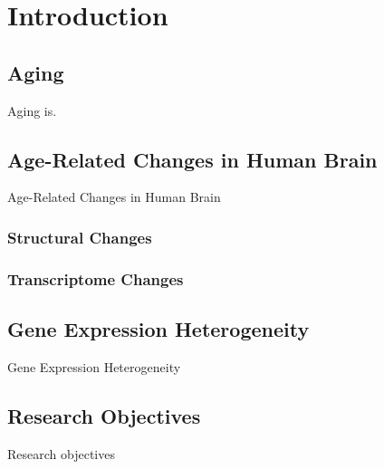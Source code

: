 \chapter{Introduction}
\label{chp:b1}

\section{Aging}
 Aging is.


\section{Age-Related Changes in Human Brain}
Age-Related Changes in Human Brain
\subsection{Structural Changes}
\subsection{Transcriptome Changes}

\section{Gene Expression Heterogeneity}
Gene Expression Heterogeneity

\section{Research Objectives}
 Research objectives



